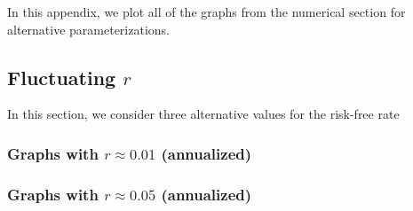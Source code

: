 
In this appendix, we plot all of the graphs from the numerical section for alternative
parameterizations.

\newpage
\clearpage
\subsection{Fluctuating $r$}

In this section, we consider three alternative values for the risk-free rate

\subsubsection{Graphs with $r \approx 0.01$ (annualized)}

  \begin{center}
    \begin{figure}[H]
    \end{figure}
  \end{center}

  \begin{center}
    \begin{figure}[H]
    \end{figure}
  \end{center}

  \begin{center}
    \begin{figure}[H]
    \end{figure}
  \end{center}

  \begin{center}
    \begin{figure}[H]
    \end{figure}
  \end{center}

\newpage
\clearpage
\subsubsection{Graphs with $r \approx 0.05$ (annualized)}


